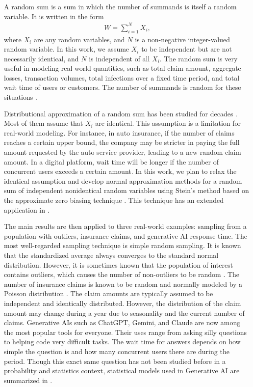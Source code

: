 \documentclass[pdflatex,sn-mathphys-ay]{sn-jnl}
\newcommand{\bea}{\begin{eqnarray}}
\newcommand{\ena}{\end{eqnarray}}
\theoremstyle{thmstyleone}%
\theoremstyle{thmstyletwo}%
\theoremstyle{thmstylethree}%
\begin{document}
A random sum is a sum in which the number of summands is itself a random variable. It is written in the form
\bea \label{rs}
W = \sum_{i=1}^N X_i,
\ena
where $X_i$ are any random variables, and $N$ is a non-negative integer-valued random variable. In this work, we assume $X_i$ to be independent but are not necessarily identical, and $N$ is independent of all $X_i$. The random sum is very useful in modeling real-world quantities, such as total claim amount, aggregate losses, transaction volumes, total infections over a fixed time period, and total wait time of users or customers. The number of summands is random for these situations \citep{gnedenko2020random, YonghintJantai2025}.  

Distributional approximation of a random sum has been studied for decades \citep{robbins1948asymptotic,renyi1963central,sunklodas2015normal}.
Most of them assume that $X_i$ are identical. This assumption is a limitation for real-world modeling. For instance, in auto insurance, if the number of claims reaches a certain upper bound, the company may be stricter in paying the full amount requested by the auto service provider, leading to a new random claim amount. In a digital platform, wait time will be longer if the number of concurrent users exceeds a certain amount. In this work, we plan to relax the identical assumption and develop normal approximation methods for a random sum of independent nonidentical random variables using Stein's method based on the approximate zero biasing technique \citep{NW2017}. This technique has an extended application in \cite{JW25}.  

The main results are then applied to three real-world examples: sampling from a population with outliers, insurance claims, and generative AI response time. The most well-regarded sampling technique is simple random sampling. It is known that the standardized average always converges to the standard normal distribution. However, it is sometimes known that the population of interest contains outliers, which causes the number of non-outliers to be random \citep{barnett1994outliers}. The number of insurance claims is known to be random and normally modeled by a Poisson distribution %
\citep{klugman2012loss,denuit2007actuarial}.
The claim amounts are typically assumed to be independent and identically distributed. However, the distribution of the claim amount may change during a year due to seasonality and the current number of claims. Generative AIs such as ChatGPT, Gemini, and Claude are now among the most popular tools for everyone. Their uses range from asking silly questions to helping code very difficult tasks. The wait time for answers depends on how simple the question is and how many concurrent users there are during the period. Though this exact same question has not been studied before in a probability and statistics context, statistical models used in Generative AI are summarized in \cite{dobriban2025statistical}.  
\end{document}
